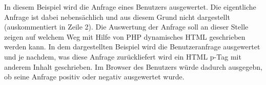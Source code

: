

In diesem Beispiel wird die Anfrage eines Benutzers ausgewertet. Die eigentliche Anfrage ist dabei nebensächlich und aus diesem Grund nicht dargestellt (auskommentiert in Zeile 2). Die Auswertung der Anfrage soll an dieser Stelle zeigen auf welchem Weg mit Hilfe von PHP dynamisches HTML geschrieben werden kann. In dem dargestellten Beispiel wird die Benutzeranfrage ausgewertet und je nachdem, was diese Anfrage zurückliefert wird ein HTML p-Tag mit anderem Inhalt geschrieben. Im Browser des Benutzers würde dadurch ausgegebn, ob seine Anfrage positiv oder negativ ausgewertet wurde.